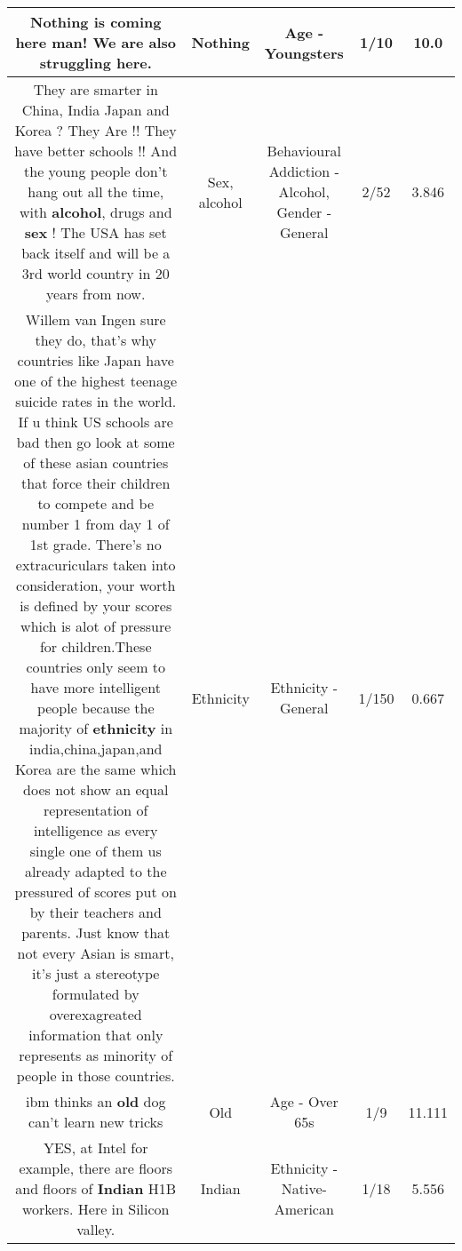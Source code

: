 \documentclass[11pt]{article}
\newlength\mylength
\begin{document}
\begin{center}
\begin{longtable}{|C{.65\mylength}|C{.30\mylength}|C{.12\mylength}|C{.12\mylength}|C{.12\mylength}|}
  \small Nothing is coming here man! We are also struggling here.\normalsize   & Nothing & Age - Youngsters & 1/10 & 10.0 \\  \hline
  \small They are smarter in China, India Japan and Korea ?  They Are !! They have better schools !! And the young people don't hang out  all the time, with \textbf{alcohol}, drugs and \textbf{sex} ! The USA has set back itself and will be a 3rd world country in 20 years from now.\normalsize   & Sex, alcohol & Behavioural Addiction - Alcohol, Gender - General & 2/52 & 3.846 \\  \hline
  \small Willem van Ingen sure they do, that's why countries like Japan have one of the highest teenage suicide rates in the world. If u think US schools are bad then go look at some of these asian countries that force their children to compete and be number 1 from day 1 of 1st grade. There's no extracuriculars taken into consideration, your worth is defined by your scores which is alot of pressure for children.These countries only seem to have more intelligent people because the majority of \textbf{ethnicity} in india,china,japan,and Korea are the same which does not show an equal representation of intelligence as every single one of them us already adapted to the pressured of scores put on by their teachers and parents. Just know that not every Asian is smart, it's just a stereotype formulated by overexagreated information that only represents as minority of people in those countries.\normalsize   & Ethnicity & Ethnicity - General & 1/150 & 0.667 \\  \hline
  \small ibm thinks an \textbf{old} dog can't learn new tricks\normalsize   & Old & Age - Over 65s & 1/9 & 11.111 \\  \hline
  \small YES, at Intel for example, there are floors and floors of \textbf{Indian} H1B workers. Here in Silicon valley.\normalsize   & Indian & Ethnicity - Native-American & 1/18 & 5.556 \\  \hline

\end{longtable}
\end{center}
\end{document}
